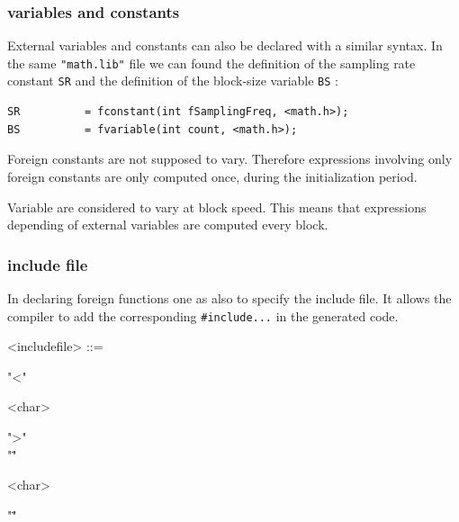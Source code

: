 \documentclass[a4paper]{book}
\begin{document}

\subsubsection{variables and constants} 
External variables and constants can also be declared with a similar syntax. In the same \lstinline'"math.lib"' file we can found the definition of the sampling rate constant \lstinline'SR' and the definition of the block-size variable \lstinline'BS' :

\begin{lstlisting}
SR 			= fconstant(int fSamplingFreq, <math.h>);
BS          = fvariable(int count, <math.h>);
\end{lstlisting}

Foreign constants are not supposed to vary. Therefore expressions involving only foreign constants are only computed once, during the initialization period. 

Variable are considered to vary at block speed. This means that expressions depending of external variables are computed every block.


\subsubsection{include file}
In declaring foreign functions one as also to specify the include file. It allows the \faust compiler to add the corresponding \lstinline'#include...' in the generated code.

\begin{grammar}
  <includefile> ::= 
  \begin{syntdiag}
    \begin{stack}
      "<"
      \begin{rep}
        <char>
      \end{rep}
      ">" \\ 
      "\""
      \begin{rep}
        <char>
      \end{rep}
      "\""
    \end{stack}
  \end{syntdiag}
\end{grammar}
\end{document}
